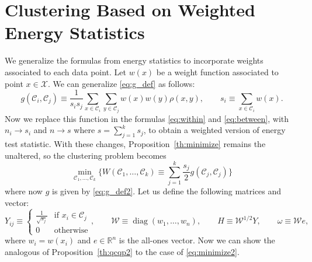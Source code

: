 \documentclass[aps,preprint,nofootinbib,floatfix]{revtex4-1}
\DeclareMathOperator{\diag}{diag}
\newcommand\C{{\mathcal{C}}}
\newcommand\e{e}
\newcommand\om{\omega}
\begin{document}
\section{Clustering Based on Weighted Energy Statistics}
\label{sec:weighted}

We generalize the formulas from energy statistics to incorporate
weights associated to each data point.
Let $w(x)$ be a weight function associated to point $x \in \mathcal{X}$.
We can generalize \eqref{eq:g_def} as follows:
\begin{equation}
\label{eq:g_def2}
g(\C_i, \C_j) \equiv \dfrac{1}{s_i s_j} \sum_{x\in \C_i}\sum_{y\in\C_j}
w(x)w(y) \rho(x,y), \qquad s_i \equiv \sum_{x\in\C_i} w(x).
\end{equation}
Now we replace this function in the formulas \eqref{eq:within} and
\eqref{eq:between}, with 
$n_i \to s_i$ and $n \to s$ where $s = \sum_{j=1}^k s_j$,
to obtain a weighted version of energy test statistic. With these
changes, Proposition~\ref{th:minimize} remains the unaltered, so the
clustering problem becomes
\begin{equation}
\label{eq:minimize2}
\min_{\C_1, \dotsc, \C_k} 
\bigg\{
W(\C_1,\dotsc,\C_k) \equiv \sum_{j=1}^k \dfrac{s_j}{2} g(\C_j,\C_j)
\bigg\}
\end{equation}
where now $g$ is given by \eqref{eq:g_def2}. 
Let us define the following matrices and vector:
\begin{equation}
\label{eq:weighted_matrices}
Y_{ij} \equiv \begin{cases}
\tfrac{1}{\sqrt{s_j}} & \mbox{if $x_i \in \C_j$} \\
0 & \mbox{otherwise}
\end{cases}, \qquad
\mathcal{W} \equiv \diag(w_1,\dotsc,w_n), \qquad
H \equiv \mathcal{W}^{1/2} Y, \qquad
\om \equiv \mathcal{W} \e,
\end{equation}
where $w_i = w(x_i)$ and $\e \in \mathbb{R}^n$ is the all-ones
vector. Now we can show the analogous of
Proposition~\ref{th:qcqp2} to the case of \eqref{eq:minimize2}.
\end{document}
